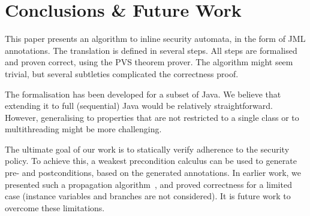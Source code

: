 \section{Conclusions \& Future Work }\label{SecConcl}

This paper presents an algorithm to inline security automata, in the
form of JML annotations. The translation is defined in several
steps. All steps are formalised and proven correct, using the PVS
theorem prover. The algorithm might seem trivial, but several
subtleties complicated the correctness proof.


The formalisation has been developed for a subset of Java. We believe
that extending it to full (sequential) Java would be relatively
straightforward. However, generalising to properties that are not
restricted to a single class or to multithreading might be more
challenging.

The ultimate goal of our work is to statically verify adherence to the
security policy. To achieve this, a weakest precondition calculus can
be used to generate pre- and postconditions, based on the generated
\Set annotations. In earlier work, we presented such a
propagation algorithm~\cite{PavlovaBBHL04}, and proved correctness for
a limited case (instance variables and branches are not
considered). It is future work to overcome these limitations.
